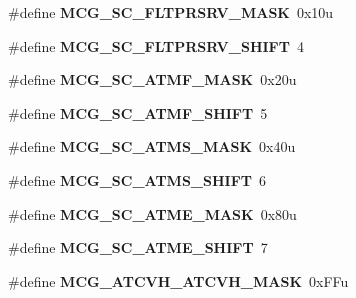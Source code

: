 \begin{DoxyCompactItemize}
\mbox{\label{group___m_c_g___register___masks_ga1eea80f4646116c2ca2a68aa3469436a}} 
\#define {\bfseries M\+C\+G\+\_\+\+S\+C\+\_\+\+F\+L\+T\+P\+R\+S\+R\+V\+\_\+\+M\+A\+SK}~0x10u
\item 
\mbox{\label{group___m_c_g___register___masks_gac75a3cb915913ba4acc64a098bba4eb5}} 
\#define {\bfseries M\+C\+G\+\_\+\+S\+C\+\_\+\+F\+L\+T\+P\+R\+S\+R\+V\+\_\+\+S\+H\+I\+FT}~4
\item 
\mbox{\label{group___m_c_g___register___masks_ga15326687d7d214b4847a3cae6e6cdfaa}} 
\#define {\bfseries M\+C\+G\+\_\+\+S\+C\+\_\+\+A\+T\+M\+F\+\_\+\+M\+A\+SK}~0x20u
\item 
\mbox{\label{group___m_c_g___register___masks_gac7fd1ff91fc1de6800a18f875398d966}} 
\#define {\bfseries M\+C\+G\+\_\+\+S\+C\+\_\+\+A\+T\+M\+F\+\_\+\+S\+H\+I\+FT}~5
\item 
\mbox{\label{group___m_c_g___register___masks_gaf5a12b51cc62a0ce10f3fbecdebd0222}} 
\#define {\bfseries M\+C\+G\+\_\+\+S\+C\+\_\+\+A\+T\+M\+S\+\_\+\+M\+A\+SK}~0x40u
\item 
\mbox{\label{group___m_c_g___register___masks_ga9a8ce406d5868276e9c3b37190ab89b1}} 
\#define {\bfseries M\+C\+G\+\_\+\+S\+C\+\_\+\+A\+T\+M\+S\+\_\+\+S\+H\+I\+FT}~6
\item 
\mbox{\label{group___m_c_g___register___masks_gaf9545e815c86bd04d8513af024cb8617}} 
\#define {\bfseries M\+C\+G\+\_\+\+S\+C\+\_\+\+A\+T\+M\+E\+\_\+\+M\+A\+SK}~0x80u
\item 
\mbox{\label{group___m_c_g___register___masks_ga146594251d4266d02fecc44c1f0dd6ae}} 
\#define {\bfseries M\+C\+G\+\_\+\+S\+C\+\_\+\+A\+T\+M\+E\+\_\+\+S\+H\+I\+FT}~7
\item 
\mbox{\label{group___m_c_g___register___masks_gaf989f84acb1a8c91c7c98c2255651b00}} 
\#define {\bfseries M\+C\+G\+\_\+\+A\+T\+C\+V\+H\+\_\+\+A\+T\+C\+V\+H\+\_\+\+M\+A\+SK}~0x\+F\+Fu

\end{DoxyCompactItemize}
